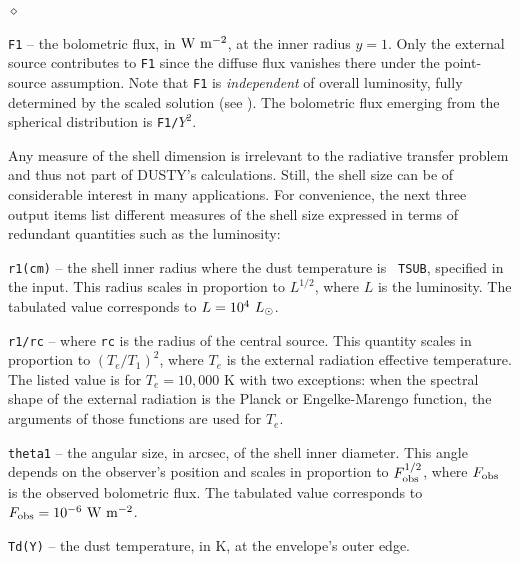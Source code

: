 \documentclass[11pt]{article}
\def\D  {{\sf DUSTY}}
\def\E#1{\hbox{$10^{#1}$}}
\def\Lo     {\hbox{$L_{\odot}$}}
\begin{document}
\begin{list}{$\diamond$}{}
\item {\tt F1} -- the bolometric flux, in $\rm W\ m^{-2}$, at the inner radius
    $y = 1$. Only the external source contributes to {\tt F1} since the diffuse
    flux vanishes there under the point-source assumption. Note that {\tt F1}
    is {\em independent} of overall luminosity, fully determined by the scaled
    solution (see \cite{IE97}). The bolometric flux emerging from the spherical
    distribution is {\tt F1/$Y^2$}.

Any measure of the shell dimension is irrelevant to the radiative transfer
problem and thus not part of \D's calculations.  Still, the shell size can be
of considerable interest in many applications. For convenience, the next three
output items list different measures of the shell size expressed in terms of
redundant quantities such as the luminosity:

\item {\tt r1(cm)} -- the shell inner radius where the dust temperature is {\tt
    TSUB}, specified in the input.  This radius scales in proportion to
    $L^{1/2}$, where $L$ is the luminosity. The tabulated value corresponds to
    $L = \E4\ \Lo$.

\item {\tt r1/rc} -- where {\tt rc} is the radius of the central source.  This
    quantity scales in proportion to $(T_e/T_1)^2$, where $T_e$ is the external
    radiation effective temperature.  The listed value is for $T_e = 10,000$ K
    with two exceptions: when the spectral shape of the external radiation is
    the Planck or Engelke-Marengo function, the arguments of those functions
    are used for $T_e$.

\item {\tt theta1} -- the angular size, in arcsec, of the shell inner diameter.
    This angle depends on the observer's position and scales in proportion to
    $F_{\rm obs}^{1/2}$, where $F_{\rm obs}$ is the observed bolometric flux.
    The tabulated value corresponds to $F_{\rm obs} = \E{-6}\ \rm W\ m^{-2}$.

\item {\tt Td(Y)} -- the dust temperature, in K, at the envelope's outer edge.


\end{list}
\end{document}
